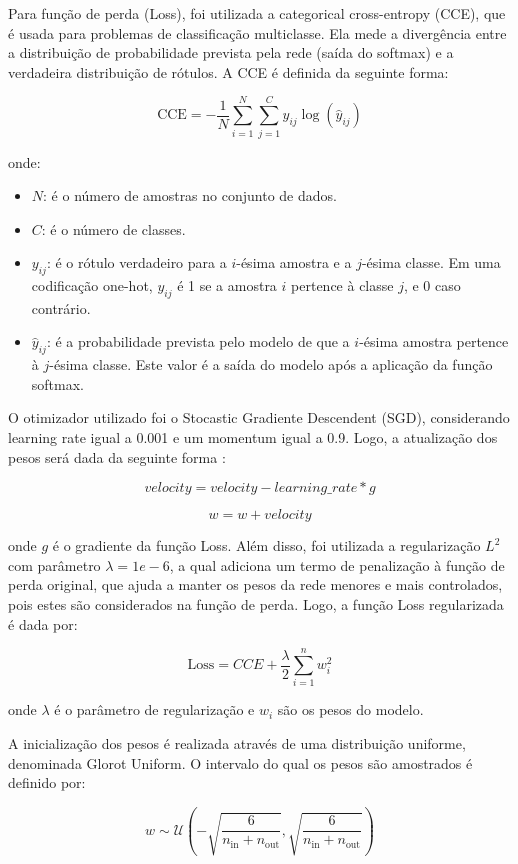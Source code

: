 \documentclass[]{abntex2}
\begin{document}
Para função de perda (Loss), foi utilizada a categorical cross-entropy (CCE), que é usada para problemas de classificação multiclasse. Ela mede a divergência entre a distribuição de probabilidade prevista pela rede (saída do softmax) e a verdadeira distribuição de rótulos. A CCE é definida da seguinte forma:

\[
\text{CCE} = -\dfrac{1}{N}\sum_{i=1}^{N} \sum_{j=1}^{C} y_{ij} \log(\hat{y}_{ij})
\]

onde:

\begin{itemize}
    \item \(N\): é o número de amostras no conjunto de dados.
    \item \(C\): é o número de classes.
    \item \(y_{ij}\): é o rótulo verdadeiro para a \(i\)-ésima amostra e a \(j\)-ésima classe. Em uma codificação one-hot, \(y_{ij}\) é 1 se a amostra \(i\) pertence à classe \(j\), e 0 caso contrário.
    \item \(\hat{y}_{ij}\): é a probabilidade prevista pelo modelo de que a \(i\)-ésima amostra pertence à \(j\)-ésima classe. Este valor é a saída do modelo após a aplicação da função softmax. 
\end{itemize}

O otimizador utilizado foi o Stocastic Gradiente Descendent (SGD), considerando learning rate igual a 0.001 e um momentum igual a 0.9. Logo, a atualização dos pesos será dada da seguinte forma \cite{keras}:

\[
velocity = velocity - learning\_rate * g 
\]

\[
w = w + velocity
\]

onde \(g\) é o gradiente da função Loss. Além disso, foi utilizada a regularização \( L^2 \) com parâmetro \(\lambda = 1e-6\), a qual adiciona um termo de penalização à função de perda original, que ajuda a manter os pesos da rede menores e mais controlados, pois estes são considerados na função de perda. Logo, a função Loss regularizada é dada por:

\[
\text{Loss} = CCE + \dfrac{\lambda}{2} \sum_{i=1}^{n} w_i^2
\]

onde \(\lambda\) é o parâmetro de regularização e \(w_i\) são os pesos do modelo. 

A inicialização dos pesos é realizada através de uma distribuição uniforme, denominada Glorot Uniform. O intervalo do qual os pesos são amostrados é definido por:

\[
w \sim \mathcal{U}\left(-\sqrt{\frac{6}{n_{\text{in}} + n_{\text{out}}}}, \sqrt{\frac{6}{n_{\text{in}} + n_{\text{out}}}}\right)
\]
\end{document}
